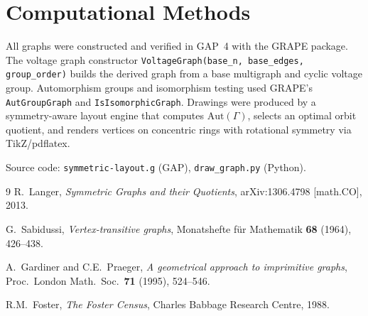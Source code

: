 \documentclass[11pt]{article}
\theoremstyle{definition}
\begin{document}
\section*{Computational Methods}

All graphs were constructed and verified in GAP~4 with the GRAPE package.
The voltage graph constructor \texttt{VoltageGraph(base\_n, base\_edges, group\_order)}
builds the derived graph from a base multigraph and cyclic voltage group.
Automorphism groups and isomorphism testing used GRAPE's \texttt{AutGroupGraph}
and \texttt{IsIsomorphicGraph}.
Drawings were produced by a symmetry-aware layout engine
that computes $\mathrm{Aut}(\Gamma)$, selects an optimal orbit quotient,
and renders vertices on concentric rings with rotational symmetry via TikZ/pdflatex.

Source code: \texttt{symmetric-layout.g} (GAP), \texttt{draw\_graph.py} (Python).

\begin{thebibliography}{9}
R.~Langer, \emph{Symmetric Graphs and their Quotients},
arXiv:1306.4798 [math.CO], 2013.

G.~Sabidussi, \emph{Vertex-transitive graphs},
Monatshefte f\"ur Mathematik \textbf{68} (1964), 426--438.

A.~Gardiner and C.E.~Praeger,
\emph{A geometrical approach to imprimitive graphs},
Proc.\ London Math.\ Soc.\ \textbf{71} (1995), 524--546.

R.M.~Foster, \emph{The Foster Census},
Charles Babbage Research Centre, 1988.
\end{thebibliography}
\end{document}

